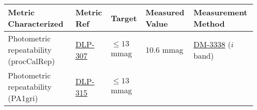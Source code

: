 \documentclass[DM,toc]{lsstdoc}
\begin{document}
\begin{longtable}[]{@{}lllll@{}}
\toprule
\begin{minipage}[b]{0.25\columnwidth}\raggedright\strut
Metric Characterized\strut
\end{minipage} & \begin{minipage}[b]{0.11\columnwidth}\raggedright\strut
Metric Ref\strut
\end{minipage} & \begin{minipage}[b]{0.20\columnwidth}\raggedright\strut
Target\strut
\end{minipage} & \begin{minipage}[b]{0.11\columnwidth}\raggedright\strut
Measured Value\strut
\end{minipage} & \begin{minipage}[b]{0.19\columnwidth}\raggedright\strut
Measurement Method\strut
\end{minipage}\tabularnewline
\midrule
\endhead
\begin{minipage}[t]{0.25\columnwidth}\raggedright\strut
Photometric repeatability (procCalRep)\strut
\end{minipage} & \begin{minipage}[t]{0.11\columnwidth}\raggedright\strut
\href{https://jira.lsstcorp.org/browser/DLP-307}{DLP-307}\strut
\end{minipage} & \begin{minipage}[t]{0.20\columnwidth}\raggedright\strut
\(\leq 13\) mmag\strut
\end{minipage} & \begin{minipage}[t]{0.11\columnwidth}\raggedright\strut
10.6 mmag\strut
\end{minipage} & \begin{minipage}[t]{0.19\columnwidth}\raggedright\strut
\href{https://jira.lsstcorp.org/browse/DM-3338}{DM-3338} ($i$ band)\strut
\end{minipage}\tabularnewline
\begin{minipage}[t]{0.25\columnwidth}\raggedright\strut
Photometric repeatability (PA1gri)\strut
\end{minipage} & \begin{minipage}[t]{0.11\columnwidth}\raggedright\strut
\href{https://jira.lsstcorp.org/browser/DLP-315}{DLP-315}\strut
\end{minipage} & \begin{minipage}[t]{0.20\columnwidth}\raggedright\strut
\(\leq 13\) mmag\strut
\end{minipage} & \begin{minipage}[t]{0.11\columnwidth}\raggedright\strut

\end{minipage}
\end{longtable}
\end{document}
